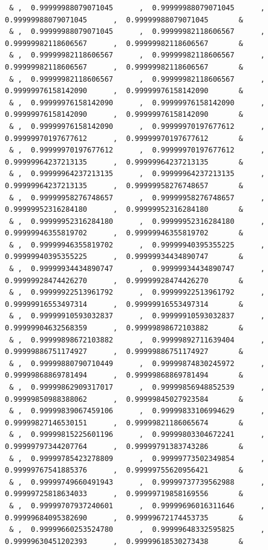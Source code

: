 \documentclass[a4paper,10pt]{report}
\begin{document}
{\begin{verbatim}
 & ,  0.99999988079071045      ,  0.99999988079071045      ,  0.99999988079071045      ,  0.99999988079071045       &
 & ,  0.99999988079071045      ,  0.99999982118606567      ,  0.99999982118606567      ,  0.99999982118606567       &
 & ,  0.99999982118606567      ,  0.99999982118606567      ,  0.99999982118606567      ,  0.99999982118606567       &
 & ,  0.99999982118606567      ,  0.99999982118606567      ,  0.99999976158142090      ,  0.99999976158142090       &
 & ,  0.99999976158142090      ,  0.99999976158142090      ,  0.99999976158142090      ,  0.99999976158142090       &
 & ,  0.99999976158142090      ,  0.99999970197677612      ,  0.99999970197677612      ,  0.99999970197677612       &
 & ,  0.99999970197677612      ,  0.99999970197677612      ,  0.99999964237213135      ,  0.99999964237213135       &
 & ,  0.99999964237213135      ,  0.99999964237213135      ,  0.99999964237213135      ,  0.99999958276748657       &
 & ,  0.99999958276748657      ,  0.99999958276748657      ,  0.99999952316284180      ,  0.99999952316284180       &
 & ,  0.99999952316284180      ,  0.99999952316284180      ,  0.99999946355819702      ,  0.99999946355819702       &
 & ,  0.99999946355819702      ,  0.99999940395355225      ,  0.99999940395355225      ,  0.99999934434890747       &
 & ,  0.99999934434890747      ,  0.99999934434890747      ,  0.99999928474426270      ,  0.99999928474426270       &
 & ,  0.99999922513961792      ,  0.99999922513961792      ,  0.99999916553497314      ,  0.99999916553497314       &
 & ,  0.99999910593032837      ,  0.99999910593032837      ,  0.99999904632568359      ,  0.99999898672103882       &
 & ,  0.99999898672103882      ,  0.99999892711639404      ,  0.99999886751174927      ,  0.99999886751174927       &
 & ,  0.99999880790710449      ,  0.99999874830245972      ,  0.99999868869781494      ,  0.99999868869781494       &
 & ,  0.99999862909317017      ,  0.99999856948852539      ,  0.99999850988388062      ,  0.99999845027923584       &
 & ,  0.99999839067459106      ,  0.99999833106994629      ,  0.99999827146530151      ,  0.99999821186065674       &
 & ,  0.99999815225601196      ,  0.99999803304672241      ,  0.99999797344207764      ,  0.99999791383743286       &
 & ,  0.99999785423278809      ,  0.99999773502349854      ,  0.99999767541885376      ,  0.99999755620956421       &
 & ,  0.99999749660491943      ,  0.99999737739562988      ,  0.99999725818634033      ,  0.99999719858169556       &
 & ,  0.99999707937240601      ,  0.99999696016311646      ,  0.99999684095382690      ,  0.99999672174453735       &
 & ,  0.99999660253524780      ,  0.99999648332595825      ,  0.99999630451202393      ,  0.99999618530273438       &

\end{verbatim}}
\end{document}
